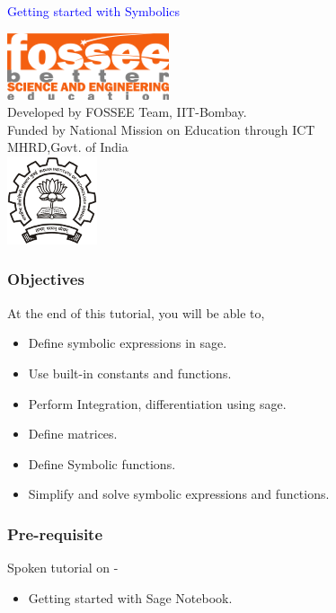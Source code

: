 \documentclass[presentation]{beamer}
\title{}
\author{FOSSEE}
\date{}
\begin{document}
\begin{frame}

\begin{center}
\vspace{12pt}
\textcolor{blue}{\huge Getting started with Symbolics}
\end{center}
\vspace{18pt}
\begin{center}
\vspace{10pt}
\includegraphics[scale=0.95]{../images/fossee-logo.png}\\
\vspace{5pt}
\scriptsize Developed by FOSSEE Team, IIT-Bombay. \\ 
\scriptsize Funded by National Mission on Education through ICT\\
\scriptsize  MHRD,Govt. of India\\
\includegraphics[scale=0.30]{../images/iitb-logo.png}\\
\end{center}
\end{frame}
\begin{frame}
\frametitle{Objectives}
\label{sec-2}

 At the end of this tutorial, you will be able to,


\begin{itemize}
\item Define symbolic expressions in sage.
\item Use built-in constants and functions.
\item Perform Integration, differentiation using sage.
\item Define matrices.
\item Define Symbolic functions.
\item Simplify and solve symbolic expressions and functions.
\end{itemize}
\end{frame}
\begin{frame}
\frametitle{Pre-requisite}
\label{sec-3}

  Spoken tutorial on -

\begin{itemize}
\item Getting started with Sage Notebook.
\end{itemize}
\end{frame}
\end{document}
